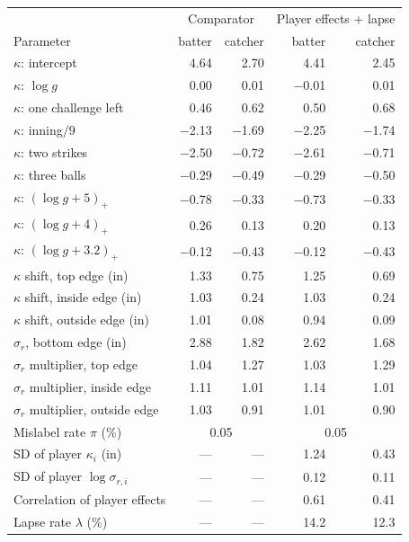 \begin{tabular}{lrrrr}
\toprule
& \multicolumn{2}{c}{Comparator} & \multicolumn{2}{c}{Player effects + lapse} \\
Parameter & batter & catcher & batter & catcher \\
\midrule
$\kappa$: intercept & 4.64 & 2.70 & 4.41 & 2.45 \\
$\kappa$: $\log g$ & 0.00 & 0.01 & \ensuremath{-}0.01 & 0.01 \\
$\kappa$: one challenge left & 0.46 & 0.62 & 0.50 & 0.68 \\
$\kappa$: inning$/9$ & \ensuremath{-}2.13 & \ensuremath{-}1.69 & \ensuremath{-}2.25 & \ensuremath{-}1.74 \\
$\kappa$: two strikes & \ensuremath{-}2.50 & \ensuremath{-}0.72 & \ensuremath{-}2.61 & \ensuremath{-}0.71 \\
$\kappa$: three balls & \ensuremath{-}0.29 & \ensuremath{-}0.49 & \ensuremath{-}0.29 & \ensuremath{-}0.50 \\
$\kappa$: $(\log g +5)_+$ & \ensuremath{-}0.78 & \ensuremath{-}0.33 & \ensuremath{-}0.73 & \ensuremath{-}0.33 \\
$\kappa$: $(\log g +4)_+$ & 0.26 & 0.13 & 0.20 & 0.13 \\
$\kappa$: $(\log g +3.2)_+$ & \ensuremath{-}0.12 & \ensuremath{-}0.43 & \ensuremath{-}0.12 & \ensuremath{-}0.43 \\
$\kappa$ shift, top edge (in) & 1.33 & 0.75 & 1.25 & 0.69 \\
$\kappa$ shift, inside edge (in) & 1.03 & 0.24 & 1.03 & 0.24 \\
$\kappa$ shift, outside edge (in) & 1.01 & 0.08 & 0.94 & 0.09 \\
$\sigma_r$, bottom edge (in) & 2.88 & 1.82 & 2.62 & 1.68 \\
$\sigma_r$ multiplier, top edge & 1.04 & 1.27 & 1.03 & 1.29 \\
$\sigma_r$ multiplier, inside edge & 1.11 & 1.01 & 1.14 & 1.01 \\
$\sigma_r$ multiplier, outside edge & 1.03 & 0.91 & 1.01 & 0.90 \\
Mislabel rate $\pi$ (\%) & \multicolumn{2}{c}{0.05} & \multicolumn{2}{c}{0.05} \\
SD of player $\kappa_i$ (in) & --- & --- & 1.24 & 0.43 \\
SD of player $\log\sigma_{r,i}$ & --- & --- & 0.12 & 0.11 \\
Correlation of player effects & --- & --- & 0.61 & 0.41 \\
Lapse rate $\lambda$ (\%) & --- & --- & 14.2 & 12.3 \\
\bottomrule
\end{tabular}

